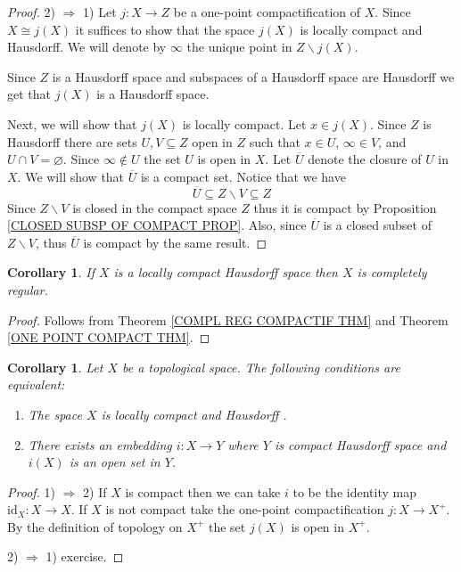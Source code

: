 \documentclass[11pt, letterpaper, oneside]{report}
\theoremstyle{pplain}
\newtheorem{corollary}[theorem]{Corollary}
\newtheorem{ITERMVALUE THM}[theorem]{Intermediate Value Theorem}
\newtheorem{HEINEBOREL THM}[theorem]{Heine-Borel Theorem}
\newtheorem{UMETR THM}[theorem]{Urysohn Metrization Theorem}
\newtheorem{UMETR2 THM}[theorem]{Urysohn Metrization Theorem (v.2)}
\theoremstyle{ddefinition}
\theoremstyle{nnn}
\newtheorem{TDA NN}[theorem]{Topological Data Analysis. }
\theoremstyle{eexercise}
\newcommand{\Ra}{\Rightarrow}
\newcommand{\id}{\mathrm{id}}
\newcommand{\ssmin}{\smallsetminus}
\newcommand{\benu}{\begin{enumerate}}
\newcommand{\eenu}{\end{enumerate}}
\begin{document}
\begin{proof}
2) $\Ra$ 1) Let $j\colon X\to Z$ be a one-point compactification of $X$. 
Since $X\cong j(X)$ it   suffices to show that the space $j(X)$ is locally 
compact and Hausdorff. We will denote by $\infty$ the unique point in $Z\ssmin j(X)$. 

Since $Z$ is a Hausdorff space and  subspaces  of a Hausdorff space
are Hausdorff we get that $j(X)$ is a Hausdorff space.

Next, we will show that $j(X)$ is locally compact. Let $x\in j(X)$. Since $Z$ is Hausdorff 
there are  sets $U, V \subseteq Z$ open in $Z$ such that $x\in U$,   $\infty \in V$, and 
$U\cap V = \varnothing$. Since $\infty \not\in U$ the set $U$ is open in $X$. 
Let $\overline{U}$ denote the closure of $U$ in $X$.  We will show that $\overline{U}$
is a compact set. Notice that we have  
$$\overline{U}\subseteq Z\ssmin V \subseteq Z$$
Since $Z\ssmin V$ is closed in the compact space $Z$ thus it is  compact by 
Proposition \ref{CLOSED SUBSP OF COMPACT PROP}. Also, since $\overline{U}$ is a closed 
subset of $Z\ssmin V$, thus $\overline{U}$ is compact by the same result.  
\end{proof}

\begin{corollary}
\label{LOC COMP HAUSD IS COMPL REG}
If $X$ is a locally compact Hausdorff space then $X$ is completely regular. 
\end{corollary}

\begin{proof}
Follows from Theorem \ref{COMPL REG COMPACTIF THM} and Theorem \ref{ONE POINT COMPACT THM}.
\end{proof}

\begin{corollary}
\label{LOC COMPACT OPEN EMB COR}
Let $X$ be a topological space. The following conditions are equivalent:
\benu
\item The space $X$ is locally compact and Hausdorff .
\item There exists an embedding $i\colon X \to Y$ where $Y$ is compact Hausdorff space and 
$i(X)$ is an open set in $Y$. 
\eenu
\end{corollary}

\begin{proof}
1) $\Ra$ 2) If $X$ is compact then we can take $i$ to be the identity map $\id_{X}\colon X \to X$.  
If $X$ is not compact take the one-point compactification $j\colon X \to X^{+}$.  
By the definition of topology on $X^{+}$ the set $j(X)$ is open in $X^{+}$. 

2) $\Ra$ 1) exercise. 
\end{proof}
\end{document}
